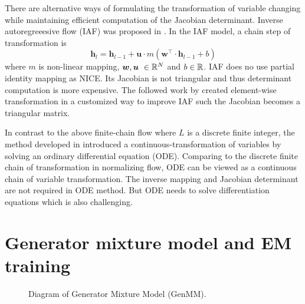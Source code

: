\begin{remark}
  There are alternative ways of formulating the transformation of variable changing while maintaining efficient computation of the Jacobian determinant. Inverse autoregreeesive flow (IAF) was proposed in \cite{rezende2015variational}. In the IAF model, a chain step of transformation is
  \begin{equation*}
    \bm{h}_l = \bm{h}_{l-1} + \bm{u} \cdot {m}(\bm{w}^{\intercal} \cdot \bm{h}_{l-1} + b)
  \end{equation*}
  where $m$ is non-linear mapping, $\bm{w}, \bm{u}~\in \mathbb{R}^{N}$ and $b\in \mathbb{R}$. IAF does no use partial identity mapping as NICE. Its Jacobian is not triangular and thus determinant computation is more expensive. The followed work by \cite{kingma2016IVF} created element-wise transformation in a customized way to improve IAF such the Jacobian becomes a triangular matrix. 
  
  In contrast to the above finite-chain flow where $L$ is a discrete finite integer, the method developed in \cite{ricky2018ODE} introduced a continuous-transformation of variables by solving an ordinary differential equation (ODE). Comparing to the discrete finite chain of transformation in normalizing flow, ODE can be viewed as a continuous chain of variable transformation. The inverse mapping and Jacobian determinant are not required in ODE method. But ODE needs to solve differentiation equations which is also challenging.
\end{remark}

\section{Generator mixture model and EM training}

\begin{figure}[tp!]
  \centering
  \caption{Diagram of Generator Mixture Model (GenMM).}\label{dia-emgm-nm}
\end{figure}

